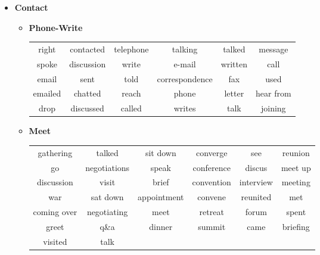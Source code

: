 \documentclass[11pt, oneside]{article}   	%
\begin{document}
\begin{itemize}
\clearpage
\item[] \textbf{Contact} 
	\vspace*{-0.2cm}
	\begin{itemize}
	\item[] \textbf{Phone-Write} \\
		 \begin{tabular}{ c c c c c c }
		 right & contacted & telephone & talking & talked & message\\spoke & discussion & write & e-mail & written & call\\email & sent & told & correspondence & fax & used\\emailed & chatted & reach & phone & letter & hear
from\\drop & discussed & called & writes & talk & joining
		\end{tabular}
	\item[] \textbf{Meet} \\
		 \begin{tabular}{ c c c c c c }
		 gathering & talked & sit down & converge & see & reunion\\go & negotiations & speak & conference & discus & meet up\\discussion & visit & brief & convention & interview & meeting\\war & sat down & appointment & convene & reunited & met\\coming over & negotiating & meet & retreat & forum & spent\\greet & q\&a & dinner & summit & came & briefing\\visited & talk
		\end{tabular}
	\end{itemize}


\end{itemize}
\end{document}
